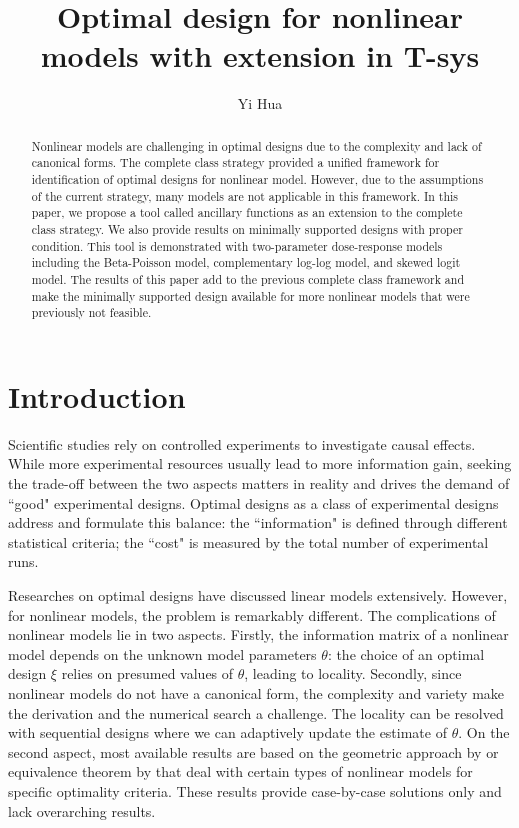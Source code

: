 \documentclass[12pt]{amsart}
\title{Optimal design for nonlinear models with extension in T-sys}
\author{Yi Hua}
\theoremstyle{definition}
\theoremstyle{remark}
\numberwithin{equation}{section}
\begin{document}
\maketitle
\begin{abstract}
Nonlinear models are challenging in optimal designs due to the complexity and lack of canonical forms. The complete class strategy provided a unified framework for identification of optimal designs for nonlinear model. However, due to the assumptions of the current strategy, many models are not applicable in this framework. In this paper, we propose a tool called ancillary functions as an extension to the complete class strategy. We also provide results on minimally supported designs with proper condition. This tool is demonstrated with two-parameter dose-response models including the Beta-Poisson model, complementary log-log model, and skewed logit model. The results of this paper add to the previous complete class framework and make the minimally supported design available for more nonlinear models that were previously not feasible. 
\end{abstract}

\section{Introduction}
Scientific studies rely on controlled experiments to investigate causal effects. While more experimental resources usually lead to more information gain, seeking the trade-off between the two aspects matters in reality and drives the demand of ``good" experimental designs. Optimal designs as a class of experimental designs address and formulate this balance: the ``information" is defined through different statistical criteria; the ``cost" is measured by the total number of experimental runs. 






Researches on optimal designs have discussed linear models extensively. However, for nonlinear models, the problem is remarkably different. The complications of nonlinear models lie in two aspects. Firstly, the information matrix of a nonlinear model depends on the unknown model parameters $\theta$: the choice of an optimal design $\xi$ relies on presumed values of $\theta$, leading to locality. 
Secondly, since nonlinear models do not have a canonical form, the complexity and variety make the derivation and the numerical search a challenge. The locality can be resolved with sequential designs where we can adaptively update the estimate of $\theta$.
On the second aspect, most available results are based on the geometric approach by \cite{elfving1952} or equivalence theorem by \cite{kiefer1960} that deal with certain types of nonlinear models for specific optimality criteria. These results provide case-by-case solutions only and lack overarching results.
\end{document}
